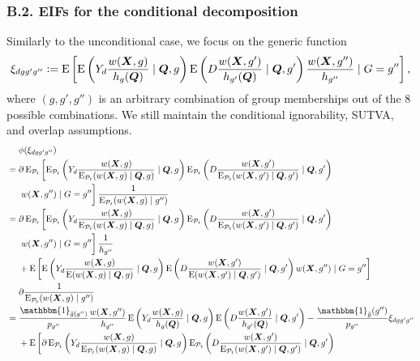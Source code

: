 \documentclass[12pt,a4paper]{article}
\newcommand{\E}{\operatorname{E}}
\def\X{{\boldsymbol X}}
\def\Q{{\boldsymbol Q}}
\def\one{\mathbbm{1}}
\newcommand{\defeq}{\vcentcolon=}
\def\pheight{\frac{w(\X,g')}{\E_{\mathcal{P}_t}(w(\X,g') \mid \Q,g')}}
\begin{document}
\subsubsection*{B.2. EIFs for the conditional decomposition}
Similarly to the unconditional case, we focus on the generic function
$$\xi_{dgg'g''} \defeq \E \left[\E \left(Y_d \frac{w(\X,g)}{h_{g}(\Q)}  \mid \Q, g \right) \E \left(D \frac{w(\X,g')}{h_{g'}(\Q)} \mid \Q, g' \right) \frac{w(\X,g'')}{h_{g''}}  \mid G=g'' \right],$$
where $(g,g',g'')$ is an arbitrary combination of group memberships out of the 8 possible combinations. We still maintain the conditional ignorability, SUTVA, and overlap assumptions.  
\begin{align*}
    &\phantom{{}={}} \phi(\xi_{dgg'g''}) \\
    &= \partial \E_{\mathcal{P}_t} \left[\E_{\mathcal{P}_t} \left(Y_d \frac{w(\X,g)}{\E_{\mathcal{P}_t}(w(\X,g) \mid \Q,g)}  \mid \Q, g \right) \E_{\mathcal{P}_t} \left(D \frac{w(\X,g')}{\E_{\mathcal{P}_t}(w(\X,g') \mid \Q,g')} \mid \Q, g' \right) \right. \\ 
    &\phantom{{}={}} \left. \vphantom{\pheight}
    w(\X,g'') \mid G=g'' \right] \frac{1}{\E_{\mathcal{P}_t}(w(\X,g) \mid g'')} \\
    &= \partial \E_{\mathcal{P}_t} \left[\E_{\mathcal{P}_t} \left(Y_d \frac{w(\X,g)}{\E_{\mathcal{P}_t}(w(\X,g) \mid \Q,g)}  \mid \Q, g \right) \E_{\mathcal{P}_t} \left(D \frac{w(\X,g')}{\E_{\mathcal{P}_t}(w(\X,g') \mid \Q,g')} \mid \Q, g' \right) \right. \\ 
    &\phantom{{}={}} \left. \vphantom{\pheight}
    w(\X,g'') \mid G=g'' \right] \frac{1}{h_{g''}} \\
    &\phantom{{}={}} + \E \left[\E \left(Y_d \frac{w(\X,g)}{\E(w(\X,g) \mid \Q,g)}  \mid \Q, g \right) \E \left(D \frac{w(\X,g')}{\E(w(\X,g') \mid \Q,g')} \mid \Q, g' \right) 
    w(\X,g'') \mid G=g'' \right] \\
    &\phantom{{}={}} \partial \frac{1}{\E_{\mathcal{P}_t}(w(\X,g) \mid g'')} \\
    &=\frac{\one_{\Tilde{g}(g'')}}{p_{g''}}\frac{w(\X,g'')}{h_{g''}} \E \left(Y_d \frac{w(\X,g)}{h_{g}(\Q)}  \mid \Q, g \right) \E \left(D \frac{w(\X,g')}{h_{g'}(\Q)} \mid \Q, g' \right) - \frac{\one_{\Tilde{g}}(g'')}{p_{g''}}\xi_{dgg'g''} \\
    &\phantom{{}={}} + \E \left[\partial \E_{\mathcal{P}_t} \left(Y_d \frac{w(\X,g)}{\E_{\mathcal{P}_t}(w(\X,g) \mid \Q,g)}  \mid \Q, g \right) \E_{\mathcal{P}_t} \left(D \frac{w(\X,g')}{\E_{\mathcal{P}_t}(w(\X,g') \mid \Q,g')} \mid \Q, g' \right) \right. \\ 

\end{align*}
\end{document}
